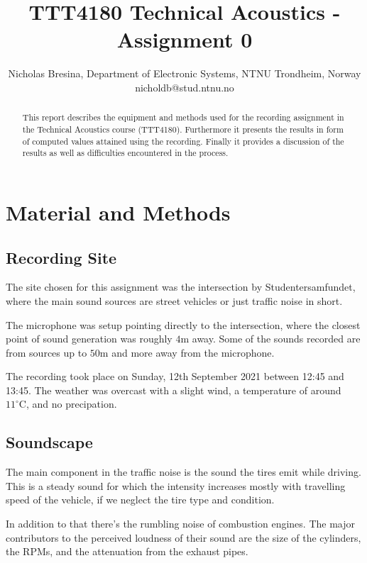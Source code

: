 \documentclass[twocolumn]{article}
\begin{document}
\title{TTT4180 Technical Acoustics - Assignment 0}

\author{Nicholas Bresina, Department of Electronic Systems, NTNU Trondheim, Norway \\
nicholdb@stud.ntnu.no}

\maketitle\thispagestyle{empty}

\begin{abstract}
This report describes the equipment and methods used for the recording assignment in the Technical
Acoustics course (TTT4180).
Furthermore it presents the results in form of computed values attained using the recording.
Finally it provides a discussion of the results as well as difficulties encountered in the process.
\end{abstract}

\section{Material and Methods}
\subsection{Recording Site}
The site chosen for this assignment was the intersection by Studentersamfundet, where the main sound sources
are street vehicles or just traffic noise in short.

The microphone was setup pointing directly to the intersection, where the closest point of sound generation
was roughly $4\textrm{m}$ away.
Some of the sounds recorded are from sources up to $50\textrm{m}$ and more away from the microphone.

The recording took place on Sunday, 12th September 2021 between 12:45 and 13:45.
The weather was overcast with a slight wind, a temperature of around $11^\circ\textrm{C}$,
and no precipation.

\subsection{Soundscape}
The main component in the traffic noise is the sound the tires emit while driving.
This is a steady sound for which the intensity increases mostly with travelling speed of the vehicle, if we
neglect the tire type and condition.

In addition to that there's the rumbling noise of combustion engines.
The major contributors to the perceived loudness of their sound are the size of the cylinders, the RPMs, and
the attenuation from the exhaust pipes.
\end{document}
